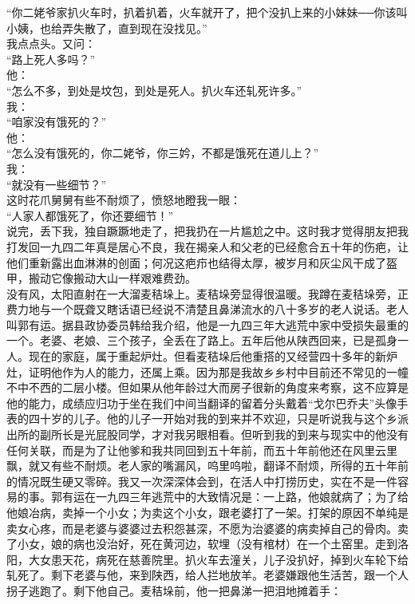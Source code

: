 “你二姥爷家扒火车时，扒着扒着，火车就开了，把个没扒上来的小妹妹{\Add ──}你该叫小姨，也给弄失散了，直到现在没找见。”\\

我点点头。又问：\\

“路上死人多吗？”\\

他：\\

“怎么不多，到处是坟包，到处是死人。扒火车还轧死许多。”\\

我：\\

“咱家没有饿死的？”\\

他：\\

“怎么没有饿死的，你二姥爷，你三妗，不都是饿死在道儿上？”\\

我：\\

“就没有一些细节？”\\

这时花爪舅舅有些不耐烦了，愤怒地瞪我一眼：\\

“人家人都饿死了，你还要细节！”\\

说完，丢下我，独自蹶蹶地走了，把我扔在一片尴尬之中。这时我才觉得朋友把我打发回一九四二年真是居心不良，我在揭亲人和父老的已经愈合五十年的伤疤，让他们重新露出血淋淋的创面；何况这疤疖也结得太厚，被岁月和灰尘风干成了盔甲，搬动它像搬动大山一样艰难费劲。\\

没有风，太阳直射在一大溜麦秸垛上。麦秸垛旁显得很温暖。我蹲在麦秸垛旁，正费力地与一个既聋又瞎话语已经说不清楚且鼻涕流水的八十多岁的老人说话。老人叫郭有运。据县政协委员韩给我介绍，他是一九四三年大逃荒中家中受损失最重的一个。老婆、老娘、三个孩子，全丢在了路上。五年后他从陕西回来，已是孤身一人。现在的家庭，属于重起炉灶。但看麦秸垛后他重搭的又经营四十多年的新炉灶，证明他作为人的能力，还属上乘。因为那是我故乡乡村中目前还不常见的一幢不中不西的二层小楼。但如果从他年龄过大而房子很新的角度来考察，这不应算是他的能力，成绩应归功于坐在我们中间当翻译的留着分头戴着“戈尔巴乔夫”头像手表的四十岁的儿子。他的儿子一开始对我的到来并不欢迎，只是听说我与这个乡派出所的副所长是光屁股同学，才对我另眼相看。但听到我的到来与现实中的他没有任何关联，而是为了让他爹和我共同回到五十年前，而五十年前他还在风里云里飘，就又有些不耐烦。老人家的嘴漏风，呜里呜啦，翻译不耐烦，所得的五十年前的情况既生硬又零碎。我又一次深深体会到，在活人中打捞历史，实在不是一件容易的事。郭有运在一九四三年逃荒中的大致情况是：一上路，他娘就病了；为了给他娘冶病，卖掉一个小女；为卖这个小女，跟老婆打了一架。打架的原因不单纯是卖女心疼，而是老婆与婆婆过去积怨甚深，不愿为治婆婆的病卖掉自己的骨肉。卖了小女，娘的病也没治好，死在黄河边，软埋（没有棺材）在一个土窑里。走到洛阳，大女患天花，病死在慈善院里。扒火车去潼关，儿子没扒好，掉到火车轮下给轧死了。剩下老婆与他，来到陕西，给人拦地放羊。老婆嫌跟他生活苦，跟一个人拐子逃跑了。剩下他自己。麦秸垛前，他一把鼻涕一把泪地摊着手：\\

